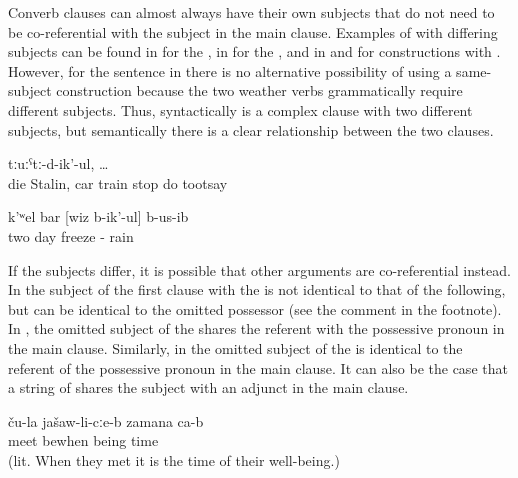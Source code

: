 Converb clauses can almost always have their own subjects that do not need to be co-referential with the subject in the main clause. Examples of  with differing subjects can be found in  for the , in  for the , and in  and  for constructions with . However, for the sentence in  there is no alternative possibility of using a same-subject construction because the two weather verbs grammatically require different subjects. Thus, syntactically  is a complex clause with two different subjects, but semantically there is a clear relationship between the two clauses.
%
\begin{exe}
	\ex	\label{ex:Stalin died, and the cars, the trains were stopped making tooot}
	 	tːuːˁtː-d-ik'-ul, \ldots\\
		die	Stalin,	car	train	stop do 	tootsay\\
	\glt	{}

	\ex	\label{ex:‎Two days it was freezing and raining}
	\gll	k'ʷel	bar	[wiz	b-ik'-ul]	b-us-ib\\
		two	day	freeze	-	rain\\
	\glt	{}
\end{exe}

If the subjects differ, it is possible that other arguments are co-referential instead. In  the subject of the first clause with the  is not identical to that of the following, but can be identical to the omitted possessor (see the comment in the footnote). In , the omitted  subject of the  shares the referent with the possessive pronoun in the main clause. Similarly, in  the omitted subject of the  is identical to the referent of the possessive pronoun in the main clause. It can also be the case that a string of  shares the subject with an adjunct in the main clause.
%
\begin{exe}
	\ex	\label{ex:When they got married, they had a good life}
	\gll	[can	ka-b-iž-ib=qːel]	ču-la	jašaw-li-cːe-b	zamana	ca-b\\
		meet	bewhen		being	time	\\
	\glt	{} (lit. When they met it is the time of their well-being.)
\end{exe}

